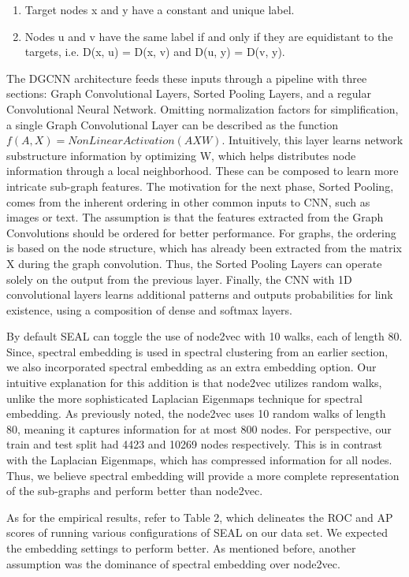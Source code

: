 \documentclass[10pt,twocolumn,letterpaper]{article}
\begin{document}
\begin{enumerate}
    \item Target nodes x and y have a constant and unique label. 
    \item Nodes u and v have the same label if and only if they are equidistant to the targets, i.e. D(x, u) = D(x, v) and D(u, y) = D(v, y).
\end{enumerate}

The DGCNN architecture feeds these inputs through a pipeline with three sections: Graph Convolutional Layers, Sorted Pooling Layers, and a regular Convolutional Neural Network. Omitting normalization factors for simplification, a single Graph Convolutional Layer can be described as the function $f(A, X) = NonLinearActivation(AXW)$. Intuitively, this layer learns network substructure information by optimizing W, which helps distributes node information through a local neighborhood. These can be composed to learn more intricate sub-graph features. The motivation for the next phase, Sorted Pooling, comes from the inherent ordering in other common inputs to CNN, such as images or text. The assumption is that the features extracted from the Graph Convolutions should be ordered for better performance. For graphs, the ordering is based on the node structure, which has already been extracted from the matrix X during the graph convolution. Thus, the Sorted Pooling Layers can operate solely on the output from the previous layer. Finally, the CNN with 1D convolutional layers learns additional patterns and outputs probabilities for link existence, using a composition of dense and softmax layers.

By default SEAL can toggle the use of node2vec with 10 walks, each of length 80. Since, spectral embedding is used in spectral clustering from an earlier section, we also incorporated spectral embedding as an extra embedding option. Our intuitive explanation for this addition is that node2vec utilizes random walks, unlike the more sophisticated Laplacian Eigenmaps technique for spectral embedding. As previously noted, the node2vec uses 10 random walks of length 80, meaning it captures information for at most 800 nodes. For perspective, our train and test split had 4423 and 10269 nodes respectively. This is in contrast with the Laplacian Eigenmaps, which has compressed information for all nodes. Thus, we believe spectral embedding will provide a more complete representation of the sub-graphs and perform better than node2vec.

As for the empirical results, refer to Table 2, which delineates the ROC and AP scores of running various configurations of SEAL on our data set. We expected the  embedding settings to perform better. As mentioned before, another assumption was the dominance of spectral embedding over node2vec. 
\end{document}
